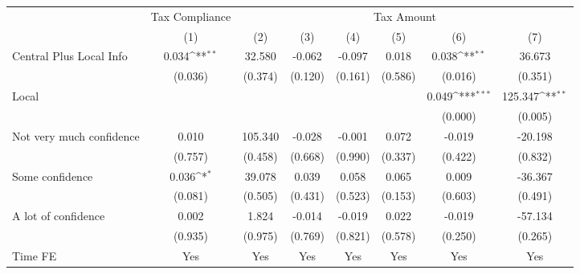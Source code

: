 {
\def\sym#1{\ifmmode^{#1}\else\(^{#1}\)\fi}
\begin{tabular}{l*{7}{c}}
\hline\hline
                &\multicolumn{1}{c}{Tax Compliance}&\multicolumn{6}{c}{Tax Amount}                                                                                   \\
                &\multicolumn{1}{c}{(1)}         &\multicolumn{1}{c}{(2)}         &\multicolumn{1}{c}{(3)}         &\multicolumn{1}{c}{(4)}         &\multicolumn{1}{c}{(5)}         &\multicolumn{1}{c}{(6)}         &\multicolumn{1}{c}{(7)}         \\
\hline
Central Plus Local Info&    0.034\sym{**} &   32.580         &   -0.062         &   -0.097         &    0.018         &    0.038\sym{**} &   36.673         \\
                &  (0.036)         &  (0.374)         &  (0.120)         &  (0.161)         &  (0.586)         &  (0.016)         &  (0.351)         \\
Local           &                  &                  &                  &                  &                  &    0.049\sym{***}&  125.347\sym{**} \\
                &                  &                  &                  &                  &                  &  (0.000)         &  (0.005)         \\
Not very much confidence&    0.010         &  105.340         &   -0.028         &   -0.001         &    0.072         &   -0.019         &  -20.198         \\
                &  (0.757)         &  (0.458)         &  (0.668)         &  (0.990)         &  (0.337)         &  (0.422)         &  (0.832)         \\
Some confidence &    0.036\sym{*}  &   39.078         &    0.039         &    0.058         &    0.065         &    0.009         &  -36.367         \\
                &  (0.081)         &  (0.505)         &  (0.431)         &  (0.523)         &  (0.153)         &  (0.603)         &  (0.491)         \\
A lot of confidence&    0.002         &    1.824         &   -0.014         &   -0.019         &    0.022         &   -0.019         &  -57.134         \\
                &  (0.935)         &  (0.975)         &  (0.769)         &  (0.821)         &  (0.578)         &  (0.250)         &  (0.265)         \\
Time FE         &      Yes         &      Yes         &      Yes         &      Yes         &      Yes         &      Yes         &      Yes         \\

\end{tabular}}
